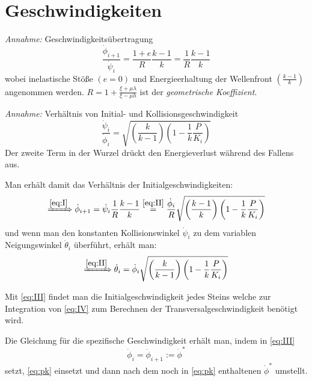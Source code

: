 \documentclass[11pt,a4paper]{scrartcl}
\def\phistar{\dot{\phi}^*}
\def\phii{\dot{\phi}_i}
\def\phiip{\dot{\phi}_{i+1}}
\def\pki{\frac{P}{K_i}}
\begin{document}
\section{Geschwindigkeiten}
\emph{Annahme:} Geschwindigkeitsübertragung
\begin{equation}\label{eq:I}
    \frac{\phiip}{\dot{\psi}_i} = \frac{1+e}{R} \frac{k-1}{k} 
    = \frac{1}{R} \frac{k-1}{k}
\end{equation}
wobei inelastische Stöße \(\left( e = 0 \right)\) und Energieerhaltung der
Wellenfront \(\left( \frac{k-1}{k} \right)\) angenommen werden.
\(R = 1+\frac{\xi + \mu\lambda}{\xi - \mu h} \) ist der 
\emph{geometrische Koeffizient}. \\
\par\noindent
\emph{Annahme:} Verhältnis von Initial- und Kollisionsgeschwindigkeit
\begin{equation}
    \frac{\dot{\psi}_i}{\phii} = \sqrt{ \left( \frac{k}{k-1} \right)
    \left( 1-\frac{1}{k}\pki \right) }
    \label{eq:II}
\end{equation}
Der zweite Term in der Wurzel drückt den Energieverlust während des Fallens
aus.\\
\par\noindent
Man erhält damit das Verhältnis der Initialgeschwindigkeiten:
\begin{equation}\label{eq:III}
    \xRightarrow{\eqref{eq:I}} \phiip = \dot{\psi}_i \frac{1}{R} \frac{k-1}{k}
    \overset{\eqref{eq:II}}{=} \frac{\phii}{R} \sqrt{ \left( \frac{k-1}{k}
    \right) \left( 1- \frac{1}{k} \pki \right) }
\end{equation}
und wenn man den konstanten Kollisionswinkel \(\dot{\psi}_i\) zu dem variablen
Neigungswinkel \(\dot{\theta}_i\) überführt, erhält man:
\begin{equation}\label{eq:IV}
    \xRightarrow{\eqref{eq:II}} \dot{\theta}_i = \phii \sqrt{ \left( \frac{k}{k-1}
    \right) \left( 1- \frac{1}{k}\pki \right) }
\end{equation}
\par\noindent
Mit \eqref{eq:III} findet man die Initialgeschwindigkeit jedes Steins welche
zur Integration von \eqref{eq:IV} zum Berechnen der Transversalgeschwindigkeit
benötigt wird. \\
\par\noindent
Die Gleichung für die spezifische Geschwindigkeit erhält man, indem in
\eqref{eq:III} \[\phii = \phiip := \phistar\] setzt, \eqref{eq:pk} einsetzt
und dann nach dem noch in \eqref{eq:pk} enthaltenen \(\phistar\) umstellt.
\end{document}
